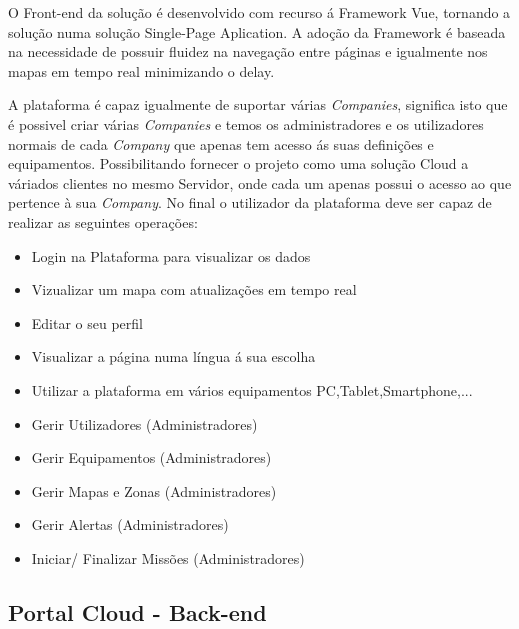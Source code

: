 \par O Front-end da solução é desenvolvido com recurso á Framework Vue, tornando a solução numa solução Single-Page Aplication. A adoção da Framework é baseada na necessidade de possuir fluidez na navegação entre páginas e igualmente nos mapas em tempo real minimizando o delay.
\par A plataforma é capaz igualmente de suportar várias \textit{Companies}, significa isto que é possivel criar várias \textit{Companies} e temos os administradores e os utilizadores normais de cada \textit{Company} que apenas tem acesso ás suas definições e equipamentos. Possibilitando fornecer o projeto como uma solução Cloud a váriados clientes no mesmo Servidor, onde cada um apenas possui o acesso ao que pertence à sua \textit{Company}.
No final o utilizador da plataforma deve ser capaz de realizar as seguintes operações:
\par
\begin{itemize}
\item Login na Plataforma para visualizar os dados
\item Vizualizar um mapa com atualizações em tempo real
\item Editar o seu perfil
\item Visualizar a página numa língua á sua escolha
\item Utilizar a plataforma em vários equipamentos PC,Tablet,Smartphone,...
\item Gerir Utilizadores (Administradores)
\item Gerir Equipamentos (Administradores)
\item Gerir Mapas e Zonas (Administradores)
\item Gerir Alertas (Administradores)
\item Iniciar/ Finalizar Missões (Administradores)
\end{itemize}
\par


\subsection{ Portal Cloud - Back-end}

